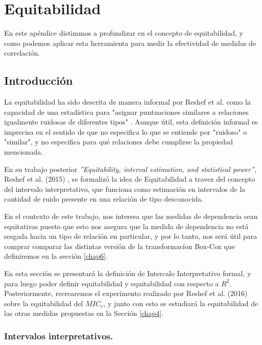 \chapter{Equitabilidad}\label{appC}
	En este ap\'endice distimmos a profundizar en el concepto de equitabilidad, y como podemos aplicar esta herramienta para medir la efectividad de medidas de correlaci\'on.
	\section{Introducci\'on}

	La equitabilidad ha sido descrita de manera informal por Reshef et al. como la capacidad de una estad\'istica para "asignar puntuaciones similares a relaciones igualmente ruidosas de diferentes tipos" \cite{Reshef2011}. Aunque \'util, esta definici\'on informal es imprecisa en el sentido de que no especifica lo que se entiende por "ruidoso" o "similar", y no especifica para qu\'e relaciones debe cumplirse la propiedad mencionada.

	En su trabajo posterior \textit{''Equitability, interval estimation, and statistical power''}, Reshef et al. (2015) \cite{Reshef2015}, se formaliz\'o la idea de Equitabilidad a travez del concepto del intervalo interpretativo, que funciona como estimaci\'on en intervalos de la cantidad de ruido presente en una relaci\'on de tipo desconocida. 

	En el contexto de este trabajo, nos interesa que las medidas de dependencia sean equitativas puesto que esto nos asegura que la medida de dependencia no est\'a sesgada hacia un tipo de relaci\'on en particular, y por lo tanto, nos ser\'a \'util para comprar comparar las distintas versi\'on de la transformac\'ion Box-Cox que definiremos en la secci\'on \ref{chap6}.

	En esta secci\'on se presentar\'a la definici\'on de Intercalo Interpretativo formal, y para luego poder definir equitabilidad y  equitabilidad con respecto a $R^2$. Posteriormente, recrearemos el experimento realizado por Reshef et al. (2016) \cite{Reshef2016} sobre la equitabilidad del $MIC_e$, y junto con esto se estudiar\'a la equitabilidad de las otras medidas propuestas en la Secci\'on \ref{chap4}. 

	\subsection[equidefiniciones]{Intervalos interpretativos.}

